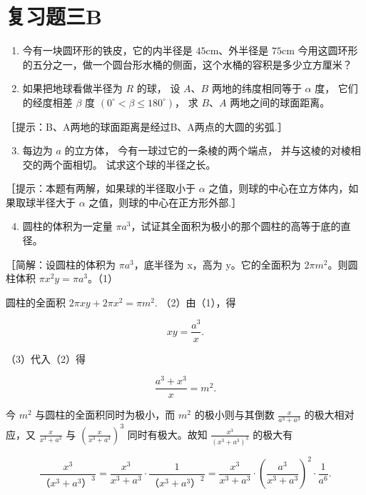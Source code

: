 \section{复习题三B}

\begin{enumerate}
\item
  今有一块圆环形的铁皮，它的内半径是 \(45\mathrm{cm}\)、外半径是
  \(75\mathrm{cm}\)
  今用这圆环形的五分之一，做一个圆台形水桶的侧面，这个水桶的容积是多少立方厘米？
\item
  如果把地球看做半径为 \(R\) 的球， 设 \(A\text{、} B\)
  两地的纬度相同等于 \(\alpha\) 度， 它们的经度相差 \(\beta\) 度
  \((0^{\circ} < \beta \leqslant 180^{\circ})\)， 求 \(B\text{、} A\)
  两地之间的球面距离。
\end{enumerate}

［提示：B、A两地的球面距离是经过B、A两点的大圆的劣弧.］

\begin{enumerate}
\setcounter{enumi}{2}
\item
  每边为 \(a\) 的立方体， 今有一球过它的一条棱的两个端点，
  并与这棱的对棱相交的两个面相切。 试求这个球的半径之长。
\end{enumerate}

［提示：本题有两解，如果球的半径取小于 \(\alpha\)
之值，则球的中心在立方体内，如果取球半径大于 \(\alpha\)
之值，则球的中心在正方形外部.］

\begin{enumerate}
\setcounter{enumi}{3}
\item
  圆柱的体积为一定量
  \(\pi a^3\)，试证其全面积为极小的那个圆柱的高等于底的直径。
\end{enumerate}

［简解：设圆柱的体积为 \(\pi a^{3}\)，底半径为 x，高为 y。它的全面积为
\(2\pi m^{2}\)。则圆柱体积 \(\pi x^{2}y = \pi a^{3}\)。（1）

圆柱的全面积 \(2\pi xy + 2\pi x^2 = \pi m^2.\) （2）由（1），得

\[
x y = \frac {a ^ {3}}{x}. \tag {3}
\]

（3）代入（2）得

\[
\frac {a ^ {3} + x ^ {3}}{x} = m ^ {2}. \tag {4}
\]

今 \(m^2\) 与圆柱的全面积同时为极小，而 \(m^2\) 的极小则与其倒数
\(\frac{x}{a^3 + a^3}\) 的极大相对应，又 \(\frac{x}{x^3 + a^3}\) 与
\(\left(\frac{x}{x^3 + a^3}\right)^3\) 同时有极大。故知
\(\frac{x^3}{(x^3 + a^3)^3}\) 的极大有

\[
\frac {x ^ {3}}{\text{（}x ^ {3} + a ^ {3}\text{）} ^ {3}} = \frac {x ^ {3}}{x ^ {3} + a ^ {3}} \cdot \frac {1}{\text{（}x ^ {3} + a ^ {3}\text{）} ^ {2}} = \frac {x ^ {3}}{x ^ {3} + a ^ {3}} \cdot \left(\frac {a ^ {3}}{x ^ {3} + a ^ {3}}\right) ^ {2} \cdot \frac {1}{a ^ {6}}.
\]

